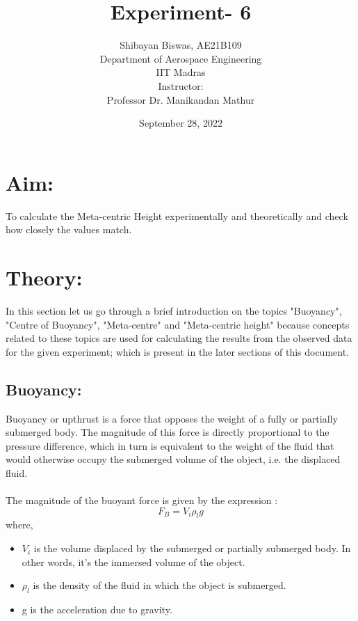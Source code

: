 \documentclass[12pt,a4paper]{article}
\author{ Shibayan Biswas, AE21B109\\ Department of Aerospace Engineering\\ IIT Madras\\[3ex] Instructor:\\ \large Professor Dr. Manikandan Mathur}
\title{Experiment- 6}
\date{September 28, 2022}
\begin{document}
\maketitle
\hline
\section{Aim:}
To calculate the Meta-centric Height experimentally and theoretically and check how closely the values match.
\section{Theory:}
In this section let us go through a brief introduction on the topics "Buoyancy", "Centre of Buoyancy", "Meta-centre" and "Meta-centric height" because concepts related to these topics are used for calculating the results from the observed data for the given experiment; which is present in the later sections of this document. 
\subsection{Buoyancy:}
Buoyancy or upthrust is a force that opposes the weight of a fully or partially submerged body. The magnitude of this force is directly proportional to the pressure difference, which in turn is equivalent to the weight of the fluid that would otherwise occupy the submerged volume of the object, i.e. the displaced fluid.\\
\\The magnitude of the buoyant force is given by the expression :
\begin{equation}
\text{$F_B$} = \text{$V_i \rho_l g$}
\end{equation}
where,
\begin{itemize}
\item $V_i$ is the volume displaced by the submerged or partially submerged body. In other words, it’s the immersed volume of the object.
\item $\rho_l$ is the density of the fluid in which the object is submerged.
\item g is the acceleration due to gravity.
\end{itemize}
\end{document}
